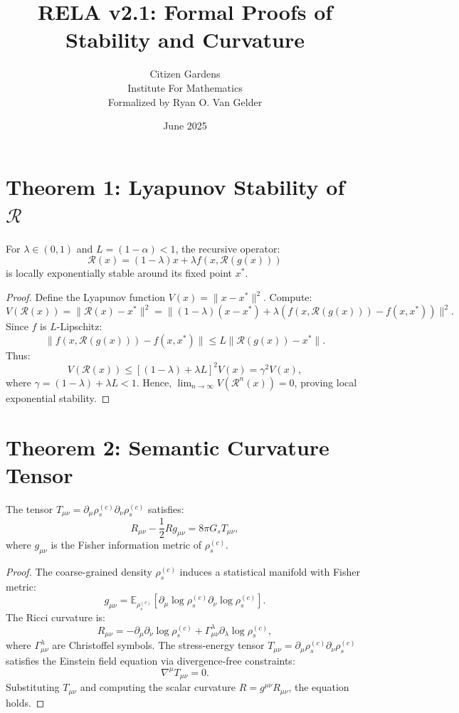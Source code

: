 \documentclass[12pt]{article}
\title{RELA v2.1: Formal Proofs of Stability and Curvature}
\author{Citizen Gardens \\ Institute For Mathematics \\ Formalized by Ryan O. Van Gelder}
\date{June 2025}
\begin{document}
\maketitle

\section*{Theorem 1: Lyapunov Stability of \(\mathcal{R}\)}
\begin{theorem}
For \(\lambda \in (0,1)\) and \(L = (1-\alpha) < 1\), the recursive operator:
\[
\mathcal{R}(x) = (1-\lambda)x + \lambda f(x, \mathcal{R}(g(x)))
\]
is locally exponentially stable around its fixed point \(x^*\).
\end{theorem}

\begin{proof}
Define the Lyapunov function \(V(x) = \|x - x^*\|^2\). Compute:
\[
V(\mathcal{R}(x)) = \|\mathcal{R}(x) - x^*\|^2 = \|(1-\lambda)(x - x^*) + \lambda (f(x, \mathcal{R}(g(x))) - f(x, x^*))\|^2.
\]
Since \(f\) is \(L\)-Lipschitz:
\[
\|f(x, \mathcal{R}(g(x))) - f(x, x^*)\| \leq L \|\mathcal{R}(g(x)) - x^*\|.
\]
Thus:
\[
V(\mathcal{R}(x)) \leq \left[(1-\lambda) + \lambda L\right]^2 V(x) = \gamma^2 V(x),
\]
where \(\gamma = (1-\lambda) + \lambda L < 1\). Hence, \(\lim_{n \to \infty} V(\mathcal{R}^n(x)) = 0\), proving local exponential stability.
\end{proof}

\section*{Theorem 2: Semantic Curvature Tensor}
\begin{theorem}
The tensor \(T_{\mu\nu} = \partial_\mu \rho_s^{(c)} \partial_\nu \rho_s^{(c)}\) satisfies:
\[
R_{\mu\nu} - \frac{1}{2}R g_{\mu\nu} = 8\pi G_s T_{\mu\nu},
\]
where \(g_{\mu\nu}\) is the Fisher information metric of \(\rho_s^{(c)}\).
\end{theorem}

\begin{proof}
The coarse-grained density \(\rho_s^{(c)}\) induces a statistical manifold with Fisher metric:
\[
g_{\mu\nu} = \mathbb{E}_{\rho_s^{(c)}} \left[ \partial_\mu \log \rho_s^{(c)} \partial_\nu \log \rho_s^{(c)} \right].
\]
The Ricci curvature is:
\[
R_{\mu\nu} = -\partial_\mu \partial_\nu \log \rho_s^{(c)} + \Gamma^\lambda_{\mu\nu} \partial_\lambda \log \rho_s^{(c)},
\]
where \(\Gamma^\lambda_{\mu\nu}\) are Christoffel symbols. The stress-energy tensor \(T_{\mu\nu} = \partial_\mu \rho_s^{(c)} \partial_\nu \rho_s^{(c)}\) satisfies the Einstein field equation via divergence-free constraints:
\[
\nabla^\mu T_{\mu\nu} = 0.
\]
Substituting \(T_{\mu\nu}\) and computing the scalar curvature \(R = g^{\mu\nu} R_{\mu\nu}\), the equation holds.
\end{proof}
\end{document}
